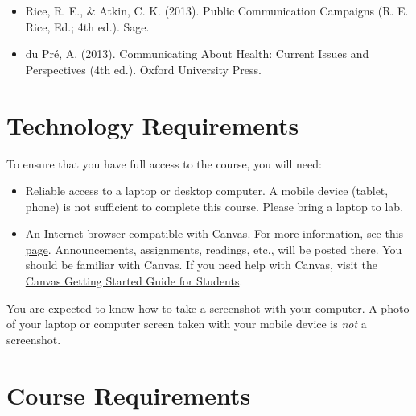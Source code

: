 \documentclass[
  letterpaper,
]{article}
\begin{document}
\begin{itemize}
\item
  Rice, R. E., \& Atkin, C. K. (2013). Public Communication Campaigns
  (R. E. Rice, Ed.; 4th ed.). Sage.
\item
  du Pré, A. (2013). Communicating About Health: Current Issues and
  Perspectives (4th ed.). Oxford University Press.
\end{itemize}

\section{Technology Requirements}\label{sec-tech}

To ensure that you have full access to the course, you will need:

\begin{itemize}
\item
  Reliable access to a laptop or desktop computer. A mobile device
  (tablet, phone) is not sufficient to complete this course. Please
  bring a laptop to lab.
\item
  An Internet browser compatible with
  \href{https://utah.instructure.com/}{Canvas}. For more information,
  see this
  \href{https://community.canvaslms.com/docs/DOC-10720-67952720329}{page}.
  Announcements, assignments, readings, etc., will be posted there. You
  should be familiar with Canvas. If you need help with Canvas, visit
  the \href{https://community.canvaslms.com/docs/DOC-10701}{Canvas
  Getting Started Guide for Students}.
\end{itemize}

\begin{tcolorbox}[enhanced jigsaw, left=2mm, toptitle=1mm, opacitybacktitle=0.6, leftrule=.75mm, title=\textcolor{quarto-callout-note-color}{\faInfo}\hspace{0.5em}{Note}, colback=white, colframe=quarto-callout-note-color-frame, toprule=.15mm, rightrule=.15mm, coltitle=black, arc=.35mm, bottomtitle=1mm, colbacktitle=quarto-callout-note-color!10!white, breakable, bottomrule=.15mm, titlerule=0mm, opacityback=0]

You are expected to know how to take a screenshot with your computer. A
photo of your laptop or computer screen taken with your mobile device is
\emph{not} a screenshot.

\end{tcolorbox}

\section{Course Requirements}\label{sec-requirements}
\end{document}

